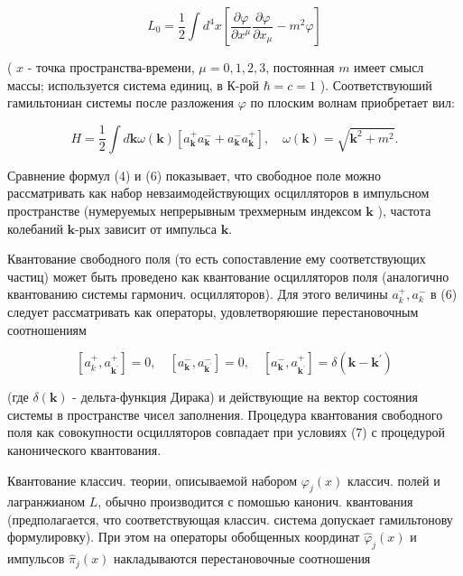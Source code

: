 \documentclass[10pt]{article}
\begin{document}
\[

L_{0}=\frac{1}{2} \int d^{4} x\left[\frac{\partial \varphi}{\partial x^{\mu}} \frac{\partial \varphi}{\partial x_{\mu}}-m^{2} \varphi\right]

\]



( $x$ - точка пространства-времени, $\mu=0,1,2,3$, постоянная $m$ имеет смысл массы; используется система единиц, в К-рой $\hbar=c=1$ ). Соответствуюший гамильтониан системы после разложения $\varphi$ по плоским волнам приобретает вил:



\[

H=\frac{1}{2} \int d \boldsymbol{k} \omega(\boldsymbol{k})\left[a_{\boldsymbol{k}}^{+} a_{\boldsymbol{k}}^{-}+a_{\boldsymbol{k}}^{-} a_{\boldsymbol{k}}^{+}\right], \quad \omega(\boldsymbol{k})=\sqrt{\boldsymbol{k}^{2}+m^{2}} .

\]



Сравнение формул (4) и (6) показывает, что свободное поле можно рассматривать как набор невзаимодействующих осцилляторов в импульсном пространстве (нумеруемых непрерывным трехмерным индексом $\boldsymbol{k}$ ), частота колебаний $\boldsymbol{k}$-рых зависит от импульса $\boldsymbol{k}$.



Квантование свободного поля (то есть сопоставление ему соответствующих частиц) может быть проведено как квантование осцилляторов поля (аналогично квантованию системы гармонич. осцилляторов). Для этого величины $a_{k}^{+}, a_{k}^{-}$ в (6) следует рассматривать как операторы, удовлетворяюшие перестановочным соотношениям



\[

\left[a_{k}^{+}, a_{\boldsymbol{k}^{\prime}}^{+}\right]=0, \quad\left[a_{\boldsymbol{k}}^{-}, a_{\boldsymbol{k}^{\prime}}^{-}\right]=0, \quad\left[a_{\boldsymbol{k}}^{-}, a_{\boldsymbol{k}^{\prime}}^{+}\right]=\delta\left(\boldsymbol{k}-\boldsymbol{k}^{\prime}\right)

\]



(где $\delta(\boldsymbol{k})$ - дельта-функция Дирака) и действующие на вектор состояния системы в пространстве чисел заполнения. Процедура квантования свободного поля как совокупности осцилляторов совпадает при условиях (7) с процедурой канонического квантования.



Квантование классич. теории, описываемой набором $\varphi_{j}(x)$ классич. полей и лагранжианом $L$, обычно производится с помошью канонич. квантования (предполагается, что соответствующая классич. система допускает гамильтонову формулировку). При этом на операторы обобщенных координат $\hat{\varphi}_{j}(x)$ и импульсов $\hat{\pi}_{j}(x)$ накладываются перестановочные соотношения
\end{document}
